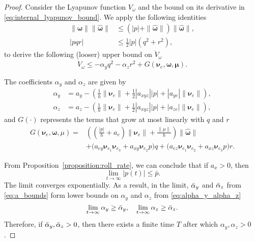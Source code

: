 \begin{proof}
    Consider the Lyapunov function $V_\omega$ and the bound on its derivative in \eqref{eq:internal_lyapunov_bound}. We apply the following identities
\begin{subequations}
    \begin{align}
        \| \bm{\omega} \| \| \hat{\bm{\omega}}\| &\leq (|p| + \|\hat{\bm{\omega}}\|) \| \hat{\bm{\omega}}\|,\\
        |pqr| & \leq \frac{1}{2}|p|(q^2 + r^2),
    \end{align}
\end{subequations}
to derive the following (looser) upper bound on $\dot{V}_{\omega}$
\begin{equation}\label{eq:internal_lyapunov_strict_bound}
    \dot{V}_\omega \leq -\alpha_y q^2 - \alpha_z r^2 + G\left(\bm{\nu}_e, \bm{\omega}, \bm{\mu}\right).
\end{equation}

The coefficients $\alpha_y$ and $\alpha_z$ are given by
\begin{subequations}\label{eq:alpha_y_alpha_z}
    \begin{align}
        \alpha_y &= a_y - \left(\frac{1}{h}\|\bm{\nu}_e\| + \frac{1}{2}|a_{xyz}| |p| + |a_{ye}| \| \bm{\nu}_e\| \right),\\
        \alpha_z &= a_z - \left(\frac{1}{h}\|\bm{\nu}_e\| + \frac{1}{2}|a_{xyz}| |p| + |a_{ze}| \| \bm{\nu}_e\| \right),
    \end{align}
\end{subequations}
and $G(\cdot)$ represents the terms that grow at most linearly with $q$ and $r$
\begin{equation}
\begin{split}
    G(\bm{\nu}_e, \bm{\omega}, \mu) = &\left(\left(\frac{|p|}{h} + a_e \right)\| \bm{\nu}_e\| + \frac{\|\mu\|}{h}\right)\|\hat{\bm{\omega}}\|\\
    &+\bigl(a_{ey} \bm{\nu}_{e_1}\bm{\nu}_{e_3} + a_{xy} \bm{\nu}_{e_2}p\bigr)q+ \bigl(a_{ez}\bm{\nu}_{e_1}\bm{\nu}_{e_2} + a_{xz}\bm{\nu}_{e_3}p\bigr)r.
    \end{split}
\end{equation}

From Proposition~\ref{proposition:roll_rate}, we can conclude that if $a_x > 0$, then 
\begin{equation}
    \lim_{t\rightarrow \infty} |p(t)| \leq \bar{p}.
\end{equation}
The limit converges exponentially. As a result, in the limit, $\Bar{\alpha}_y$ and $\Bar{\alpha}_z$ from \eqref{eq:a_bounds} form lower bounds on $\alpha_y$ and $\alpha_z$ from \eqref{eq:alpha_y_alpha_z}
\begin{equation}
    \lim_{t\rightarrow \infty} \alpha_y \geq \Bar{\alpha}_y, \quad \lim_{t\rightarrow \infty} \alpha_z \geq \Bar{\alpha}_z.
\end{equation}
Therefore, if $\bar{\alpha}_y, \Bar{\alpha}_z > 0$, then there exists a finite time $T$ after which $\alpha_y, \alpha_z > 0$.


\end{proof}
